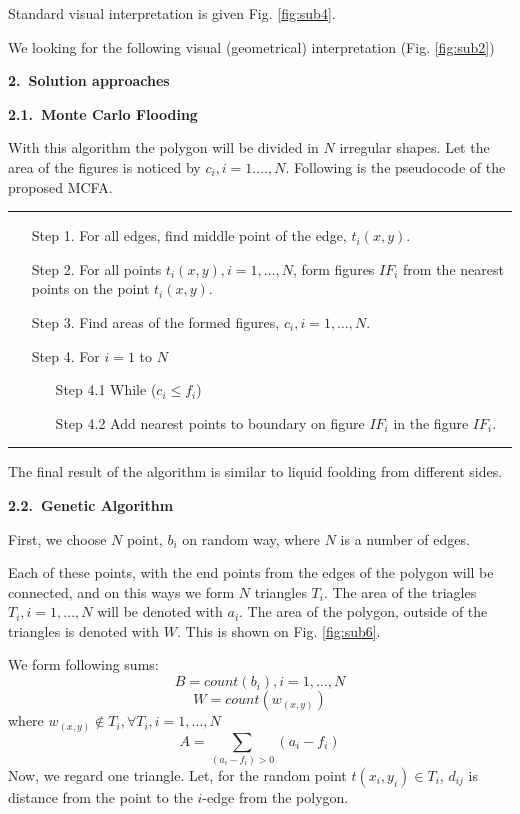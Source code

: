 \documentclass[11pt,leqno]{book}
\newcommand{\sect}[1]{\vskip7mm\par{\large \bf #1}}
\newcommand{\subsect}[1]{\vskip 3mm\par{\bf#1}}
\begin{document}
Standard visual interpretation is given Fig. \ref{fig:sub4}.

We looking for the following visual (geometrical) interpretation (Fig. \ref{fig:sub2})

\sect{2.~Solution approaches}

\subsect{2.1.~Monte Carlo Flooding}

With this algorithm the polygon will be divided in $N$ irregular shapes. Let the area of the figures is noticed by $c_i, i = 1. \ldots, N$.  Following is the pseudocode of the proposed MCFA.

\noindent\rule{\textwidth}{1pt}
\begin{itemize}
\item[Step 1.]  For all edges, find middle point of the edge, $t_i(x,y)$.
\item[Step 2.]  For all points $t_i(x,y), i=1,\ldots, N$, form figures $IF_i$ from the nearest points on the point $t_i(x,y)$. 
\item[Step 3.] Find areas of the formed figures, $c_i, i = 1, \ldots, N$.
\item[Step 4.] For $i = 1$ to $N$
\begin{itemize}
  \item[Step 4.1]  While ($c_i \leq f_i$)
  \item[Step 4.2]  Add nearest points to boundary on figure $IF_i$ in the figure $IF_i$. 
\end{itemize}
\end{itemize}
\noindent\rule{\textwidth}{1pt}

The final result of the algorithm is similar to liquid foolding from different sides.

\subsect{2.2.~Genetic Algorithm}

First, we choose $N$ point, $b_i$  on random way, where $N$ is a number of edges.

Each of these points, with the end points from the edges of the polygon will be connected, and on this ways we form $N$ triangles  $T_i$. The area of the triagles $T_i, i=1, \ldots, N $ will be denoted with $a_i$. The area of the polygon, outside of the triangles is denoted with $W$.  This is shown on Fig. \ref{fig:sub6}.

We form following sums:
$$B= count( b_i), i =1, \ldots, N$$
$$ W= count(w_{(x,y)})$$ where $w_{ (x,y)}\notin T_i, \forall{ T_i}, i=1, \dots, N$
$$ A= \sum_{(a_i - f_i)>0}(a_i-f_i)$$
Now, we regard one triangle.  Let, for the random point $t(x_i, y_i) \in T_i$,  $d_{ij}$  is distance from the point to the $i$-edge from the polygon. 
\end{document}

